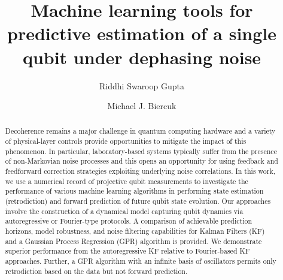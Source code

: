 
\title{Machine learning tools for predictive estimation of a single qubit under dephasing noise}

\author{Riddhi Swaroop Gupta} 

\author{Michael J. Biercuk}

\begin{abstract}
Decoherence remains a major challenge in quantum computing hardware and a variety of physical-layer controls provide opportunities to mitigate the impact of this phenomenon. In particular, laboratory-based systems typically suffer from the presence of non-Markovian noise processes and this opens an opportunity for using feedback and feedforward correction strategies exploiting underlying noise correlations. In this work, we use a numerical record of projective qubit measurements to investigate the performance of various machine learning algorithms in performing state estimation (retrodiction) and forward prediction of future qubit state evolution. Our approaches involve the construction of a dynamical model capturing qubit dynamics via autoregressive or Fourier-type protocols. A comparison of achievable prediction horizons, model robustness, and noise filtering capabilities for Kalman Filters (KF) and a Gaussian Process Regression (GPR) algorithm is provided. We demonstrate superior performance from the autoregressive KF relative to Fourier-based KF approaches. Further, a GPR algorithm with an infinite basis of oscillators permits only retrodiction based on the data but not forward prediction. 
\end{abstract}

\maketitle




